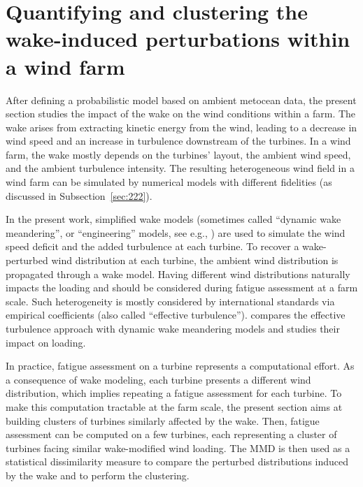 \section{Quantifying and clustering the wake-induced perturbations within a wind farm}\label{sec:wake_clust}
After defining a probabilistic model based on ambient metocean data, the present section studies the impact of the wake on the wind conditions within a farm. 
The wake arises from extracting kinetic energy from the wind, leading to a decrease in wind speed and an increase in turbulence downstream of the turbines. 
In a wind farm, the wake mostly depends on the turbines' layout, the ambient wind speed, and the ambient turbulence intensity. 
The resulting heterogeneous wind field in a wind farm can be simulated by numerical models with different fidelities (as discussed in Subsection~\ref{sec:222}). 

In the present work, simplified wake models (sometimes called ``dynamic wake meandering'', or ``engineering'' models, see e.g., \citealp{doubrawa_2020_benchmark}) are used to simulate the wind speed deficit and the added turbulence at each turbine.
To recover a wake-perturbed wind distribution at each turbine, the ambient wind distribution is propagated through a wake model. 
Having different wind distributions naturally impacts the loading and should be considered during fatigue assessment at a farm scale. 
Such heterogeneity is mostly considered by international standards via empirical coefficients (also called ``effective turbulence''). 
\citet{doubrawa_2023} compares the effective turbulence approach with dynamic wake meandering models and studies their impact on loading. 

In practice, fatigue assessment on a turbine represents a computational effort. 
As a consequence of wake modeling, each turbine presents a different wind distribution, which implies repeating a fatigue assessment for each turbine. 
To make this computation tractable at the farm scale, the present section aims at building clusters of turbines similarly affected by the wake. 
Then, fatigue assessment can be computed on a few turbines, each representing a cluster of turbines facing similar wake-modified wind loading. 
The MMD is then used as a statistical dissimilarity measure to compare the perturbed distributions induced by the wake and to perform the clustering. 


